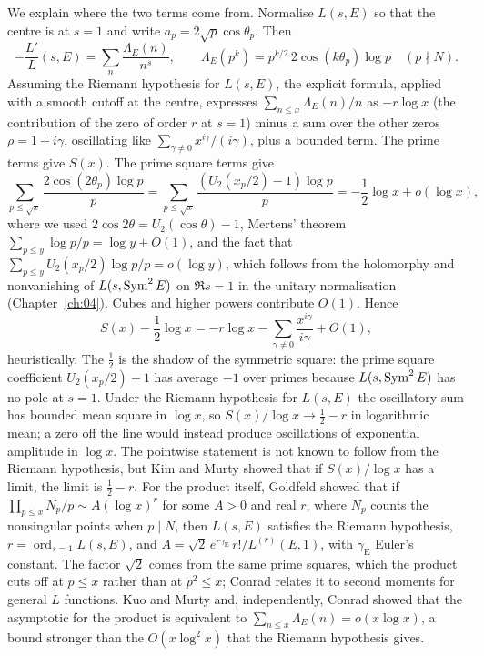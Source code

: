 We explain where the two terms come from. Normalise $L(s,E)$ so that the centre is at $s = 1$ and write $a_p=2\sqrt p\cos\theta_p$. Then
\[
-\frac{L'}{L}(s,E) = \sum_{n}\frac{\Lambda_E(n)}{n^s},\qquad \Lambda_E(p^k) = p^{k/2}\,2\cos(k\theta_p)\log p\quad(p\nmid N).
\]
Assuming the Riemann hypothesis for $L(s,E)$, the explicit formula, applied with a smooth cutoff at the centre, expresses $\sum_{n\le x}\Lambda_E(n)/n$ as $-r\log x$ (the contribution of the zero of order $r$ at $s = 1$) minus a sum over the other zeros $\rho = 1 + i\gamma$, oscillating like $\sum_{\gamma\ne0}x^{i\gamma}/(i\gamma)$, plus a bounded term. The prime terms give $S(x)$. The prime square terms give
\[
\sum_{p\le\sqrt x}\frac{2\cos(2\theta_p)\log p}{p} = \sum_{p\le\sqrt x}\frac{(U_2(x_p/2) - 1)\log p}{p} = -\frac12\log x + o(\log x),
\]
where we used $2\cos2\theta = U_2(\cos\theta) - 1$, Mertens' theorem $\sum_{p\le y}\log p/p = \log y + O(1)$, and the fact that $\sum_{p\le y}U_2(x_p/2)\log p/p = o(\log y)$, which follows from the holomorphy and nonvanishing of $L(s,\operatorname{Sym}^2 E)$ on $\Re s = 1$ in the unitary normalisation (Chapter~\ref{ch:04}). Cubes and higher powers contribute $O(1)$. Hence
\[
S(x) - \frac12\log x = -r\log x - \sum_{\gamma\ne0}\frac{x^{i\gamma}}{i\gamma} + O(1),
\]
heuristically. The $\frac12$ is the shadow of the symmetric square: the prime square coefficient $U_2(x_p/2) - 1$ has average $-1$ over primes because $L(s,\operatorname{Sym}^2E)$ has no pole at $s = 1$. Under the Riemann hypothesis for $L(s,E)$ the oscillatory sum has bounded mean square in $\log x$, so $S(x)/\log x \to \frac12 - r$ in logarithmic mean; a zero off the line would instead produce oscillations of exponential amplitude in $\log x$. The pointwise statement is not known to follow from the Riemann hypothesis, but Kim and Murty \cite{kimmurty2023} showed that if $S(x)/\log x$ has a limit, the limit is $\frac12 - r$. For the product itself, Goldfeld \cite{goldfeld1982} showed that if $\prod_{p\le x}N_p/p\sim A(\log x)^r$ for some $A>0$ and real $r$, where $N_p$ counts the nonsingular points when $p\mid N$, then $L(s,E)$ satisfies the Riemann hypothesis, $r = \operatorname{ord}_{s=1}L(s,E)$, and $A = \sqrt2\,e^{r\gamma_{\mathrm E}}\,r!/L^{(r)}(E,1)$, with $\gamma_{\mathrm E}$ Euler's constant. The factor $\sqrt2$ comes from the same prime squares, which the product cuts off at $p\le x$ rather than at $p^2\le x$; Conrad \cite{conrad2005} relates it to second moments for general $L$ functions. Kuo and Murty \cite{kuomurty2005} and, independently, Conrad showed that the asymptotic for the product is equivalent to $\sum_{n\le x}\Lambda_E(n) = o(x\log x)$, a bound stronger than the $O(x\log^2x)$ that the Riemann hypothesis gives.

